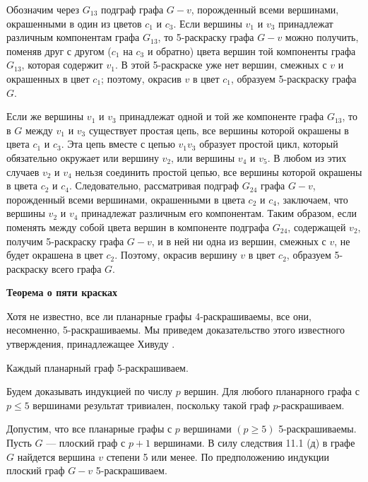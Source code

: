 Обозначим через \(G_{13}\) подграф графа \(G - v\), порожденный всеми вершинами, окрашенными в один из цветов \(c_1\) и \(c_3\). Если вершины \(v_1\) и \(v_3\) принадлежат различным компонентам графа \(G_{13}\), то 5-раскраску графа \(G - v\) можно получить, поменяв друг с другом ($c_1$ на $c_3$ и обратно) цвета вершин той компоненты графа \(G_{13}\), которая содержит \(v_1\). В этой 5-раскраске уже нет вершин, смежных с \(v\) и окрашенных в цвет \(c_1\); поэтому, окрасив \(v\) в цвет \(c_1\), образуем 5-раскраску графа \(G\).

Если же вершины \(v_1\) и \(v_3\) принадлежат одной и той же компоненте графа \(G_{13}\), то в \(G\) между \(v_1\) и \(v_3\) существует простая цепь, все вершины которой окрашены в цвета \(c_1\) и \(c_3\). Эта цепь вместе с цепью \(v_1 v_3\) образует простой цикл, который обязательно окружает или вершину \(v_2\), или вершины \(v_4\) и \(v_5\). В любом из этих случаев \(v_2\) и \(v_4\) нельзя соединить простой цепью, все вершины которой окрашены в цвета \(c_2\) и \(c_4\). Следовательно, рассматривая подграф \(G_{24}\) графа \(G - v\), порожденный всеми вершинами, окрашенными в цвета \(c_2\) и \(c_4\), заключаем, что вершины \(v_2\) и \(v_4\) принадлежат различным его компонентам. Таким образом, если поменять между собой цвета вершин в компоненте подграфа \(G_{24}\), содержащей \(v_2\), получим 5-раскраску графа \(G - v\), и в ней ни одна из вершин, смежных с \(v\), не будет окрашена в цвет \(c_2\). Поэтому, окрасив вершину \(v\) в цвет \(c_2\), образуем 5-раскраску всего графа \(G\).

\textbf{Теорема о пяти красках}

Хотя не известно, все ли планарные графы 4-раскрашиваемы, все они, несомненно, 5-раскрашиваемы. Мы приведем доказательство этого известного утверждения, принадлежащее Хивуду \cite{1}.

\begin{theorem}
Каждый планарный граф 5-раскрашиваем.
\end{theorem}

Будем доказывать индукцией по числу $p$ вершин. Для любого планарного графа с $p \leq 5$ вершинами результат тривиален, поскольку такой граф $p$-раскрашиваем.

Допустим, что все планарные графы с $p$ вершинами $(p \geq 5)$ 5-раскрашиваемы. Пусть $G$ — плоский граф с $p+1$ вершинами. В силу следствия 11.1 (д) в графе $G$ найдется вершина $v$ степени 5 или менее. По предположению индукции плоский граф $G - v$ 5-раскрашиваем.

